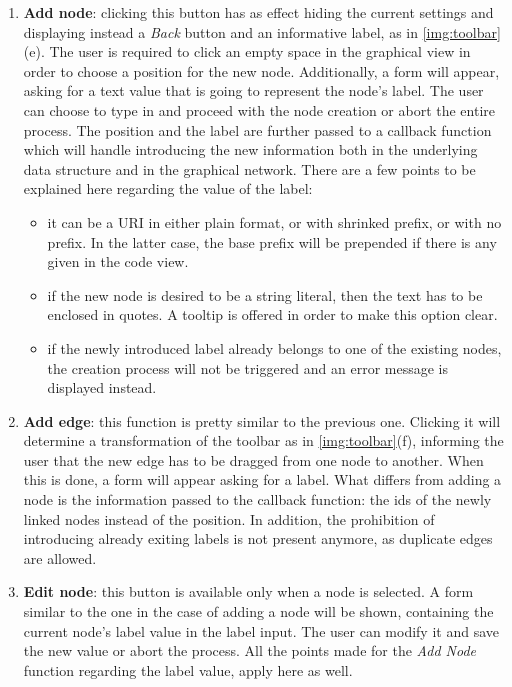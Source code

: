 \begin{enumerate}
	\item \textbf{Add node}: clicking this button has as effect hiding the current settings and displaying instead a \textit{Back} button and an informative label, as in \autoref{img:toolbar}(e). The user is required to click an empty space in the graphical view in order to choose a position for the new node. Additionally, a form will appear, asking for a text value that is going to represent the node's label. The user can choose to type in and proceed with the node creation or abort the entire process. The position and the label are further passed to a callback function which will handle introducing the new information both in the underlying data structure and in the graphical network. There are a few points to be explained here regarding the value of the label:
	\begin{itemize}[label={--}]
		\item it can be a URI in either plain format, or with shrinked prefix, or with no prefix. In the latter case, the base prefix will be prepended if there is any given in the code view.
		\item if the new node is desired to be a string literal, then the text has to be enclosed in quotes. A tooltip is offered in order to make this option clear.
		\item if the newly introduced label already belongs to one of the existing nodes, the creation process will not be triggered and an error message is displayed instead.
	\end{itemize}
	 
	\item \textbf{Add edge}: this function is pretty similar to the previous one. Clicking it will determine a transformation of the toolbar as in \autoref{img:toolbar}(f), informing the user that the new edge has to be dragged from one node to another. When this is done, a form will appear asking for a label. What differs from adding a node is the information passed to the callback function: the ids of the newly linked nodes instead of the position. In addition, the prohibition of introducing already exiting labels is not present anymore, as duplicate edges are allowed.
	
	\item \textbf{Edit node}: this button is available only when a node is selected. A form similar to the one in the case of adding a node will be shown, containing the current node's label value in the label input. The user can modify it and save the new value or abort the process. All the points made for the \textit{Add Node} function regarding the label value, apply here as well.
	

\end{enumerate}
